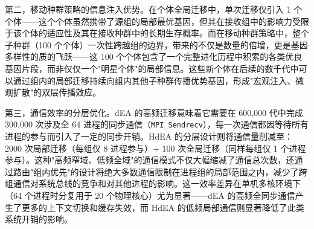 第二，移动种群策略的信息注入优势。在个体全局迁移中，单次迁移仅引入 1 个个体——这个个体虽然携带了源组的局部最优基因，但其在接收组中的影响力受限于该个体的适应性及其在接收种群中的长期生存概率。而在移动种群策略中，整个子种群（100 个个体）一次性跨越组的边界，带来的不仅是数量的倍增，更是基因多样性的质的飞跃——这 100 个个体包含了一个完整进化历程中积累的各类优良基因片段，而非仅仅一个"明星个体"的局部信息。这些新个体在后续的数千代中可以通过组内的局部迁移持续向组内其他子种群传播优势基因，形成"宏观注入、微观扩散"的双层传播效应。

第三，通信效率的分层优化。dEA 的高频迁移意味着它需要在 600,000 代中完成 300,000 次涉及全 64 进程的同步通信（\texttt{MPI\_Sendrecv}），每一次通信都因等待所有进程的参与而引入了一定的同步开销。HdEA 的分层设计则将通信量削减至：2000 次局部迁移（每组仅 8 进程参与）+ 100 次全局迁移（同样每组仅 1 个进程参与）。这种"高频窄域、低频全域"的通信模式不仅大幅缩减了通信总次数，还通过路由"组内优先"的设计将绝大多数通信限制在进程组的局部范围之内，减少了跨组通信对系统总线的竞争和对其他进程的影响。这一效率差异在单机多核环境下（64 个进程时分复用于 20 个物理核心）尤为显著——dEA 的高频全同步通信产生了更多的上下文切换和缓存失效，而 HdEA 的低频局部通信则显著降低了此类系统开销的影响。
